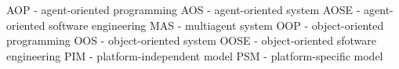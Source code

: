 

AOP - agent-oriented programming
AOS - agent-oriented system
AOSE - agent-oriented software engineering
MAS - multiagent system
OOP - object-oriented programming
OOS - object-oriented system
OOSE - object-oriented sfotware engineering
PIM - platform-independent model
PSM - platform-specific model